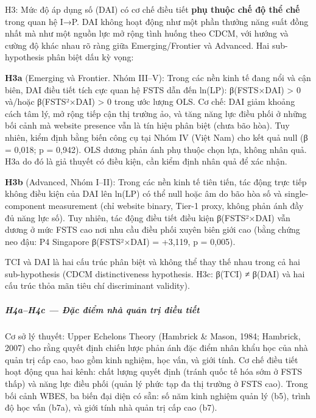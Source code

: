 \documentclass[12pt,a4paper]{article}
\begin{document}
H3: Mức độ áp dụng số (DAI) có cơ chế điều tiết \textbf{phụ thuộc chế độ
thể chế} trong quan hệ I→P. DAI không hoạt động như một phần thưởng năng
suất đồng nhất mà như một nguồn lực mở rộng tình huống theo CDCM, với
hướng và cường độ khác nhau rõ ràng giữa Emerging/Frontier và Advanced.
Hai sub-hypothesis phân biệt dấu kỳ vọng:

\textbf{H3a} (Emerging và Frontier. Nhóm III--V): Trong các nền kinh tế
đang nổi và cận biên, DAI điều tiết tích cực quan hệ FSTS dẫn đến
ln(LP): β(FSTS×DAI) \textgreater{} 0 và/hoặc β(FSTS²×DAI) \textgreater{}
0 trong ước lượng OLS. Cơ chế: DAI giảm khoảng cách tâm lý, mở rộng tiếp
cận thị trường ảo, và tăng năng lực điều phối ở những bối cảnh mà
website presence vẫn là tín hiệu phân biệt (chưa bão hòa). Tuy nhiên,
kiểm định bằng biến công cụ tại Nhóm IV (Việt Nam) cho kết quả null (β =
0,018; p = 0,942). OLS dương phản ánh phụ thuộc chọn lựa, không nhân
quả. H3a do đó là giả thuyết có điều kiện, cần kiểm định nhân quả để xác
nhận.

\textbf{H3b} (Advanced, Nhóm I--II): Trong các nền kinh tế tiên tiến,
tác động trực tiếp không điều kiện của DAI lên ln(LP) có thể null hoặc
âm do bão hòa số và single-component measurement (chỉ website binary,
Tier-1 proxy, không phản ánh đầy đủ năng lực số). Tuy nhiên, tác động
điều tiết điều kiện β(FSTS²×DAI) vẫn dương ở mức FSTS cao nơi nhu cầu
điều phối xuyên biên giới cao (bằng chứng neo đậu: P4 Singapore
β(FSTS²×DAI) = +3,119, p = 0,005).

TCI và DAI là hai cấu trúc phân biệt và không thể thay thế nhau trong cả
hai sub-hypothesis (CDCM distinctiveness hypothesis. H3c: β(TCI) ≠
β(DAI) và hai cấu trúc thỏa mãn tiêu chí discriminant validity).

\hypertarget{h4ah4c--ux111ux1eb7c-ux111iux1ec3m-nhuxe0-quux1ea3n-trux1ecb-ux111iux1ec1u-tiux1ebft}{%
\subparagraph{H4a--H4c --- Đặc điểm nhà quản trị điều
tiết}\label{h4ah4c--ux111ux1eb7c-ux111iux1ec3m-nhuxe0-quux1ea3n-trux1ecb-ux111iux1ec1u-tiux1ebft}}

Cơ sở lý thuyết: Upper Echelons Theory (Hambrick \& Mason, 1984;
Hambrick, 2007) cho rằng quyết định chiến lược phản ánh đặc điểm nhân
khẩu học của nhà quản trị cấp cao, bao gồm kinh nghiệm, học vấn, và giới
tính. Cơ chế điều tiết hoạt động qua hai kênh: chất lượng quyết định
(tránh quốc tế hóa sớm ở FSTS thấp) và năng lực điều phối (quản lý phức
tạp đa thị trường ở FSTS cao). Trong bối cảnh WBES, ba biến đại diện có
sẵn: số năm kinh nghiệm quản lý (b5), trình độ học vấn (b7a), và giới
tính nhà quản trị cấp cao (b7).
\end{document}
